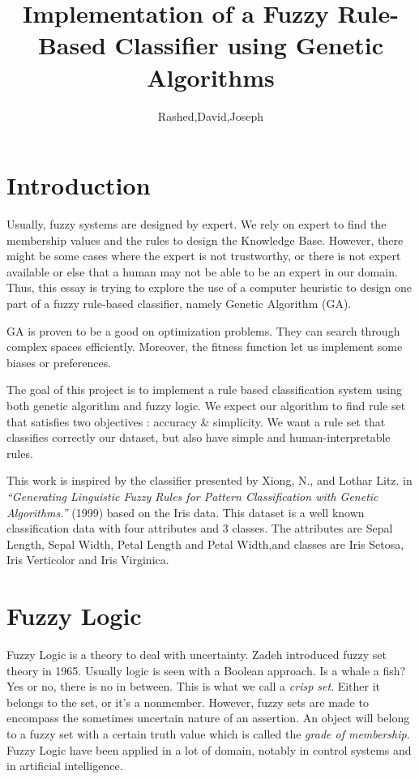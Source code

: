 \documentclass[a4paper,12pt]{article}
\begin{document}
\title{Implementation of a Fuzzy Rule-Based Classifier using Genetic Algorithms}
\author{Rashed,David,Joseph}
\maketitle



\section{Introduction}

Usually, fuzzy systems are designed by expert. We rely on expert to find the membership values and the rules to design the Knowledge Base.
However, there might be some cases where the expert is not trustworthy, or there is not expert available or else that a human may not be able to be an expert in our domain. Thus, this essay is trying to explore the use of a computer heuristic to design one part of a fuzzy rule-based classifier, namely Genetic Algorithm (GA).

GA is proven to be a good on optimization problems. They can search through complex spaces efficiently. Moreover, the fitness function let us implement some biases or preferences.

The goal of this project is to implement a rule based classification system using both genetic algorithm and fuzzy logic.
We expect our algorithm to find rule set that satisfies two objectives : accuracy \& simplicity.
We want a rule set that classifies correctly our dataset, but also have simple and human-interpretable rules. 

This work is inspired by the classifier presented by Xiong, N., and Lothar Litz. in \textit{“Generating Linguistic Fuzzy Rules for Pattern Classification with Genetic Algorithms.”} (1999) based on the Iris data. This dataset is a well known classification data with four attributes and 3 classes. The attributes are Sepal Length, Sepal Width, Petal Length and Petal Width,and classes are Iris Setosa, Iris Verticolor and Iris Virginica. \\

\section{Fuzzy Logic}

Fuzzy Logic is a theory to deal with uncertainty.
Zadeh introduced fuzzy set theory in 1965. Usually logic is seen with a Boolean approach. Is a whale a fish? Yes or no, there is no in between. This is what we call a \textit{crisp set}. Either it belongs to the set, or it's a nonmember. 
However, fuzzy sets are made to encompass the sometimes uncertain nature of an assertion. An object will belong to a fuzzy set with a certain truth value which is called the \textit{grade of membership}.
Fuzzy Logic have been applied in a lot of domain, notably in control systems and in artificial intelligence.
\end{document}
